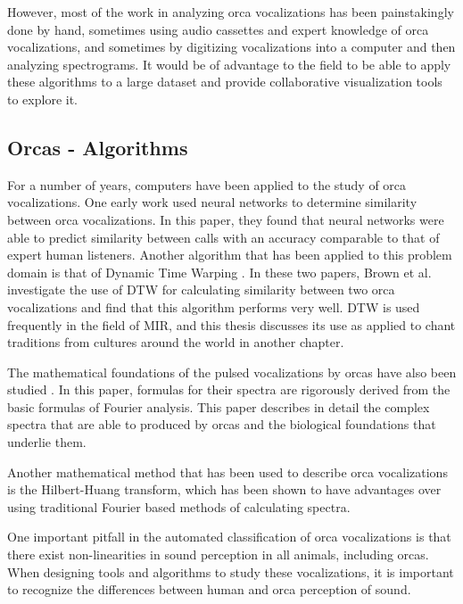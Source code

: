 \documentclass[12pt,oneside]{book}
\begin{document}
However, most of the work in analyzing orca vocalizations has been
painstakingly done by hand, sometimes using audio cassettes and expert
knowledge of orca vocalizations, and sometimes by digitizing
vocalizations into a computer and then analyzing spectrograms.  It
would be of advantage to the field to be able to apply these
algorithms to a large dataset and provide collaborative visualization
tools to explore it.

\subsection{Orcas - Algorithms}

For a number of years, computers have been applied to the study of
orca vocalizations.  One early work \cite{deecke99} used neural
networks to determine similarity between orca vocalizations.  In this
paper, they found that neural networks were able to predict similarity
between calls with an accuracy comparable to that of expert human
listeners.  Another algorithm that has been applied to this problem
domain is that of Dynamic Time Warping
\cite{brown06_orca_dtw}\cite{brown07_orca_dtw}.  In these two papers,
Brown et al. investigate the use of DTW for calculating similarity
between two orca vocalizations and find that this algorithm performs
very well.  DTW is used frequently in the field of MIR, and this
thesis discusses its use as applied to chant traditions from cultures
around the world in another chapter.

The mathematical foundations of the pulsed vocalizations by orcas have
also been studied \cite{brown08_orca_pulsed_math}.  In this paper,
formulas for their spectra are rigorously derived from the basic
formulas of Fourier analysis.  This paper describes in detail the
complex spectra that are able to produced by orcas and the biological
foundations that underlie them.

Another mathematical method that has been used to describe orca
vocalizations is the Hilbert-Huang transform, which has been shown
\cite{adam06_orca_hilber_huang} to have advantages over using
traditional Fourier based methods of calculating spectra.

One important pitfall in the automated classification of orca
vocalizations \cite{deecke06} is that there exist non-linearities in
sound perception in all animals, including orcas\cite{nummela99}.
When designing tools and algorithms to study these vocalizations, it
is important to recognize the differences between human and orca
perception of sound.
\end{document}
